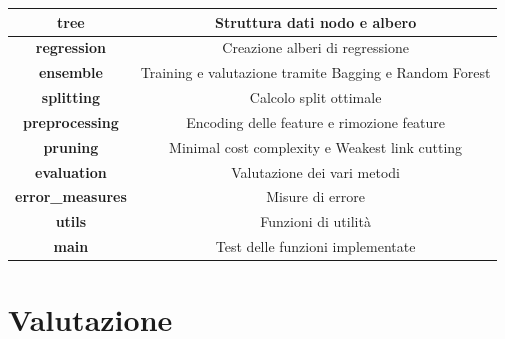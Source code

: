 \documentclass{article}
\begin{document}
    \begin{center}
        \begin{tabular}{|c|c|}
            \hline
            \textbf{tree} &  Struttura dati nodo e albero\\
            \hline
            \textbf{regression} & Creazione alberi di regressione\\
            \hline
            \textbf{ensemble} &  Training e valutazione tramite Bagging e Random Forest\\
            \hline
            \textbf{splitting} &  Calcolo split ottimale\\
            \hline
            \textbf{preprocessing} & Encoding delle feature e rimozione feature \\
            \hline
            \textbf{pruning} & Minimal cost complexity e Weakest link cutting \\
            \hline
            \textbf{evaluation} &  Valutazione dei vari metodi \\
            \hline
            \textbf{error\_measures} & Misure di errore \\
            \hline
            \textbf{utils} & Funzioni di utilità \\
            \hline
            \textbf{main} &  Test delle funzioni implementate\\
            \hline
        \end{tabular}
    \end{center}



    \section{Valutazione}
\end{document}
